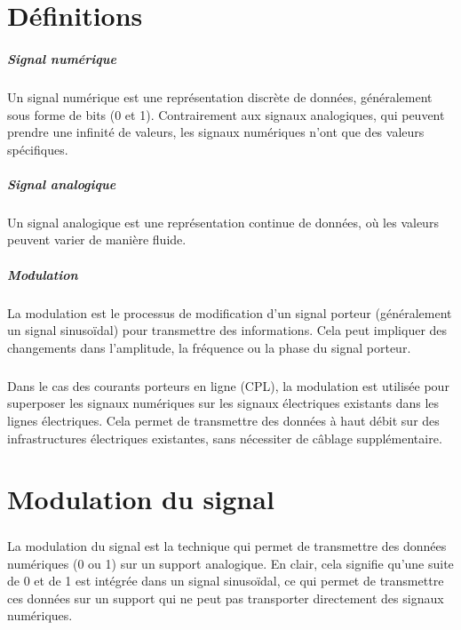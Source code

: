 \documentclass[a4paper,twocolumn]{report}
\begin{document}
\appendix
\chapter{Définitions}
\paragraph{Signal numérique} Un signal numérique est une représentation discrète
de données, généralement sous forme de bits (0 et 1). Contrairement aux signaux analogiques,
qui peuvent prendre une infinité de valeurs, les signaux numériques n'ont que des valeurs spécifiques.
\paragraph{Signal analogique} Un signal analogique est une représentation continue de données,
où les valeurs peuvent varier de manière fluide.
\paragraph{Modulation} La modulation est le processus de modification d'un signal porteur
(généralement un signal sinusoïdal) pour transmettre des informations.
Cela peut impliquer des changements dans l'amplitude, la fréquence ou la phase du signal porteur.



\paragraph{}Dans le cas des courants porteurs en ligne (CPL), la modulation est utilisée
pour superposer les signaux numériques sur les signaux électriques existants dans les lignes électriques.
Cela permet de transmettre des données à haut débit sur des infrastructures électriques existantes,
sans nécessiter de câblage supplémentaire.
\chapter{Modulation du signal}

\paragraph{}La modulation du signal est la technique qui permet de transmettre
des données numériques (0 ou 1) sur un support analogique.
En clair, cela signifie qu'une suite de 0 et de 1 est intégrée dans un signal sinusoïdal,
ce qui permet de transmettre ces données sur un support qui ne peut pas transporter directement des signaux numériques.
\end{document}
